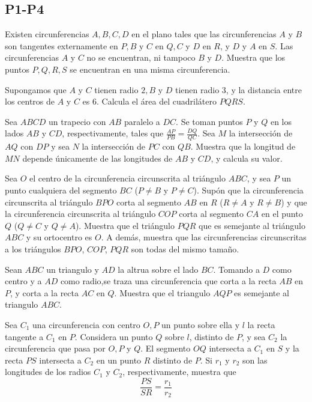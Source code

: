 \documentclass[11pt]{scrartcl}
\begin{document}
\subsection{P1-P4}
\begin{problem} [2000/1]

    Existen circunferencias $A,B,C,D$ en el plano tales que las circunferencias $A$ y $B$ son tangentes externamente en $P, B$ y $C$ en $Q, C$ y $D$ en $R$, y $D$ y $A$ en $S$. Las circunferencias $A$ y $C$ no se encuentran, ni tampoco $B$ y $D$.
Muestra que los puntos $P,Q,R,S$ se encuentran en una misma circunferencia.

Supongamos que $A$ y $C$ tienen radio $2, B$ y $D$ tienen radio $3$, y la distancia entre los centros de $A$ y $C$ es $6$. Calcula el área del cuadrilátero $PQRS$.

   
\end{problem}
\begin{problem}[2003/4] 
    Sea $ABCD$ un trapecio con $AB$ paralelo a $DC$. Se toman puntos $P$ y $Q$ en los lados $AB$ y $CD$, respectivamente, tales que $\frac{AP}{PB}=\frac{DQ}{QC}$. Sea $M$ la intersección de $AQ$ con $DP$ y sea $N$ la intersección de $PC$ con $QB$. Muestra que la longitud de $MN$ depende únicamente de las longitudes de $AB$ y $CD$, y calcula su valor.
   \end{problem}
\begin{problem} [2005/1] 
    Sea $O$ el centro de la circunferencia circunscrita al triángulo $ABC$, y sea $P$ un punto cualquiera del segmento $BC$ ($P\neq B$ y $P\neq C$). Supón que la circunferencia circunscrita al triángulo $BPO$ corta al segmento $AB$ en $R$ ($R\neq A$ y $R\neq B$) y que la circunferencia circunscrita al triángulo $COP$ corta al segmento $CA$ en el punto $Q$ ($Q\neq C$ y $Q\neq A$). Muestra que el triángulo $PQR$ que es semejante al triángulo $ABC$ y su ortocentro es $O$. A demás, muestra que las circunferencias circunscritas a los triángulos $BPO$, $COP$, $PQR$ son todas del mismo tamaño.
    \end{problem}
\begin{problem}
[2009/1] Sean $ABC$ un triangulo y $AD$ la altrua sobre el lado $BC$. Tomando a $D$ como centro y a $AD$ como radio,se traza una circunferencia que corta a la recta $AB$ en $P$, y corta a la recta $AC$ en $Q$. Muestra que el triangulo $AQP$ es semejante al triangulo $ABC$.
\end{problem}

\begin{problem}
[2012/1] Sea $C_1$ una circunferencia con centro $O, P$ un punto sobre ella y $l$ la recta tangente a $C_1$ en $P$. Considera un punto $Q$ sobre $l$, distinto de $P$, y sea $C_2$ la circunferencia que pasa por $O, P$ y $Q$. El segmento $OQ$ intersecta a $C_1$ en $S$ y la recta $PS$ intersecta a $C_2$ en un punto $R$ distinto de $P$. Si $r_1$ y $r_2$ son las longitudes de los radios $C_1$ y $C_2$, respectivamente, muestra que 
$$\frac{PS}{SR}=\frac{r_1}{r_2}$$
\end{problem}
\end{document}
